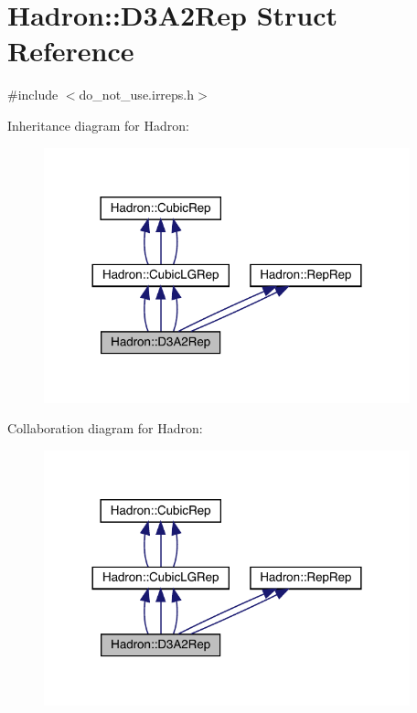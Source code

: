 \hypertarget{structHadron_1_1D3A2Rep}{}\section{Hadron\+:\+:D3\+A2\+Rep Struct Reference}
\label{structHadron_1_1D3A2Rep}


{\ttfamily \#include $<$do\+\_\+not\+\_\+use.\+irreps.\+h$>$}



Inheritance diagram for Hadron\+:
\nopagebreak
\begin{figure}[H]
\begin{center}
\leavevmode
\includegraphics[width=300pt]{da/d7e/structHadron_1_1D3A2Rep__inherit__graph}
\end{center}
\end{figure}


Collaboration diagram for Hadron\+:
\nopagebreak
\begin{figure}[H]
\begin{center}
\leavevmode
\includegraphics[width=300pt]{d3/d14/structHadron_1_1D3A2Rep__coll__graph}
\end{center}
\end{figure}
